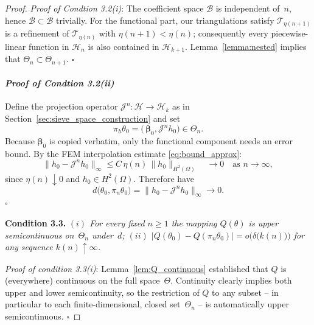 \documentclass[11pt]{article}
\newenvironment{condition}[1]
  {\par\medskip\noindent\textbf{Condition #1.}\itshape}
  {\medskip}
\begin{document}
\begin{proof}
        
		\noindent \textit{Proof of Condtion 3.2(i)}: The coefficient space $\mathcal B$ is independent of~$n$, hence $\mathcal B\subset\mathcal B$ trivially. For the functional part, our triangulations satisfy $\mathcal T_{\eta(n+1)}$ is a refinement of $\mathcal T_{\eta(n)}$ with $\eta(n+1)<\eta(n)$; consequently every piecewise-linear function in $\mathcal H_n$ is also contained in $\mathcal H_{k+1}$. Lemma~\ref{lemma:nested} implies that  $\Theta_n\subset\Theta_{n+1}$. \hfill $\square$
		
		\paragraph{\textit{Proof of Condtion 3.2(ii)}}
		Define the projection operator
		$\mathcal J^{n}\!:\mathcal H\to\mathcal H_k$ as in
		Section~\ref{sec:sieve_space_construction} and set
		\[
		\pi_h\theta_0=\bigl(\,\bm \beta_0, \mathcal J^{n}h_0\bigr)
		\in\Theta_n.
		\]
		Because $\bm \beta_0$ is copied verbatim, only the functional component
		needs an error bound.  By the FEM interpolation estimate \eqref{eq:bound_approx}:	
		\[
		\|h_0-\mathcal J^{n}h_0\|_{\infty}
		\le
		C\,\eta(n)\,\|h_0\|_{H^{2}(\Omega)}
		\quad\longrightarrow0
		\quad\text{as }n\to\infty,
		\]
		since $\eta(n)\downarrow 0$ and $h_0\in H^{2}(\Omega)$. Therefore have
		\begin{equation}\label{eq:convergence_distance}
			d\bigl(\theta_0,\pi_n\theta_0\bigr)
			= \|h_0-\mathcal J^{n}h_0\|_{\infty}
			\longrightarrow0.
		\end{equation} \hfill $\square$
		
		
		
		\begin{condition}{3.3}
        $(i)$ For every fixed \(n\ge1\) the mapping
			\(Q(\theta)\) is \emph{upper semicontinuous} on~\(\Theta_n\)
			under~\(d\); $(ii)$ \(\bigl|Q(\theta_0)-Q(\pi_n\theta_0)\bigr|
			=o\!\bigl(\delta\!\bigl(k(n)\bigr)\bigr)\) for any sequence
			\(k(n)\uparrow\infty\).
            \end{condition}

        
		\noindent\textit{Proof of condition 3.3(i)}: Lemma~\ref{lem:Q_continuous} established that \(Q\) is (everywhere)
		continuous on the full space~\(\Theta\).
		Continuity clearly implies both upper and lower semicontinuity,
		so the restriction of \(Q\) to any subset -- in particular to each
		finite-dimensional, closed set~\(\Theta_n\) -- is automatically
		upper semicontinuous. \hfill $\square$


\end{proof}
\end{document}
